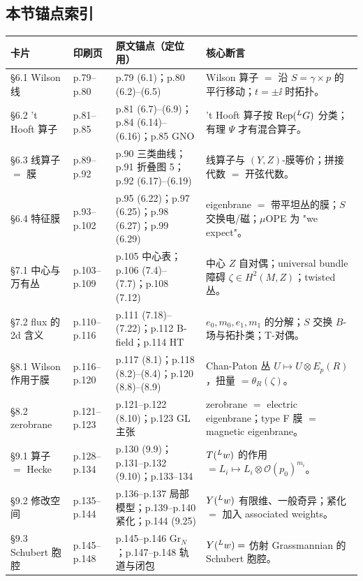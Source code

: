 \subsection*{本节锚点索引}

\begingroup\small
\begin{longtable}{@{}p{2.2cm}p{1.5cm}p{4.9cm}p{6.4cm}@{}}
\toprule
\textbf{卡片} & \textbf{印刷页} & \textbf{原文锚点（定位用）} & \textbf{核心断言} \\
\midrule
\endhead
\S6.1 Wilson 线 & p.79--p.80 & p.79 (6.1)；p.80 (6.2)--(6.5) & Wilson 算子 $=$ 沿 $S=\gamma\times p$ 的平行移动；$t=\pm\ii$ 时拓扑。\\
\S6.2 't Hooft 算子 & p.81--p.85 & p.81 (6.7)--(6.9)；p.84 (6.14)--(6.16)；p.85 GNO & 't Hooft 算子按 $\mathrm{Rep}({}^{L}G)$ 分类；有理 $\Psi$ 才有混合算子。\\
\S6.3 线算子 $=$ 膜 & p.89--p.92 & p.90 三类曲线；p.91 折叠图 5；p.92 (6.17)--(6.19) & 线算子与 $(Y,Z)$-膜等价；拼接代数 $=$ 开弦代数。\\
\S6.4 特征膜 & p.93--p.102 & p.95 (6.22)；p.97 (6.25)；p.98 (6.27)；p.99 (6.29) & eigenbrane $=$ 带平坦丛的膜；$S$ 交换电/磁；$\mu$OPE 为 "we expect"。\\
\S7.1 中心与万有丛 & p.103--p.109 & p.105 中心表；p.106 (7.4)--(7.7)；p.108 (7.12) & 中心 $Z$ 自对偶；universal bundle 障碍 $\zeta\in H^2(M,Z)$；twisted 丛。\\
\S7.2 flux 的 2d 含义 & p.110--p.116 & p.111 (7.18)--(7.22)；p.112 B-field；p.114 HT & $e_0,m_0,e_1,m_1$ 的分解；$S$ 交换 $B$-场与拓扑类；T-对偶。\\
\S8.1 Wilson 作用于膜 & p.116--p.120 & p.117 (8.1)；p.118 (8.2)--(8.4)；p.120 (8.8)--(8.9) & Chan-Paton 丛 $U\mapsto U\otimes E_p(R)$，扭量 $=\theta_R(\zeta)$。\\
\S8.2 zerobrane & p.121--p.123 & p.121--p.122 (8.10)；p.123 GL 主张 & zerobrane $=$ electric eigenbrane；type F 膜 $=$ magnetic eigenbrane。\\
\S9.1 算子 $=$ Hecke & p.128--p.134 & p.130 (9.9)；p.131--p.132 (9.10)；p.133--134 & $T({}^{L}w)$ 的作用 $=L_i\mapsto L_i\otimes\mathcal O(p_0)^{m_i}$。\\
\S9.2 修改空间 & p.135--p.144 & p.136--p.137 局部模型；p.139--p.140 紧化；p.144 (9.25) & $Y({}^{L}w)$ 有限维、一般奇异；紧化 $=$ 加入 associated weights。\\
\S9.3 Schubert 胞腔 & p.145--p.148 & p.145--p.146 $\mathrm{Gr}_N$；p.147--p.148 轨道与闭包 & $Y({}^{L}w)=$ 仿射 Grassmannian 的 Schubert 胞腔。\\

\end{longtable}
